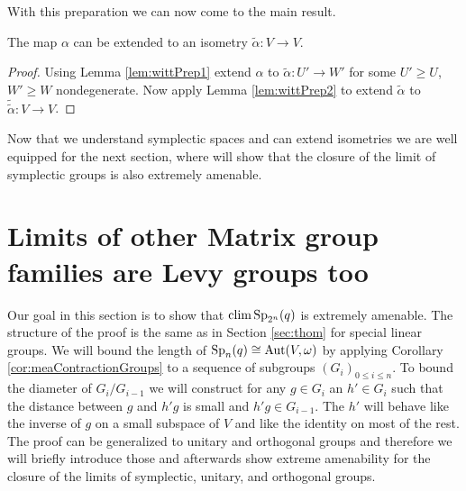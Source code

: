 With this preparation we can now come to the main result.
\begin{corollary}\label{lem:witt}
The map $\alpha$ can be extended to an isometry $\tilde{\alpha}\colon V\to V$.
\end{corollary}
\begin{proof}
Using Lemma \ref{lem:wittPrep1} extend $\alpha$ to $\tilde{\alpha}\colon U'\to W'$ for some $U'\geq U$, $W'\geq W$ nondegenerate. Now apply Lemma \ref{lem:wittPrep2} to extend $\tilde{\alpha}$ to $\tilde{\tilde{\alpha}}\colon V\to V$.
\end{proof}

Now that we understand symplectic spaces and can extend isometries we are well equipped for the next section, where will show that the closure of the limit of symplectic groups is also extremely amenable.


\section{Limits of other Matrix group families are Levy groups too}\label{sec:mySec}


Our goal in this section is to show that $\operatorname{clim} \operatorname{Sp}_{2^n}(q)$ is extremely amenable. The structure of the proof is the same as in Section \ref{sec:thom} for special linear groups. We will bound the length of $\operatorname{Sp}_n(q)\cong\operatorname{Aut}(V,\omega)$ by applying Corollary \ref{cor:meaContractionGroups} to a sequence of subgroups $(G_i)_{0\leq i\leq n}$. To bound the diameter of $G_i/G_{i-1}$ we will construct for any $g\in G_i$ an $h'\in G_i$ such that the distance between $g$ and $h'g$ is small and $h'g\in G_{i-1}$. The $h'$ will behave like the inverse of $g$ on a small subspace of $V$ and like the identity on most of the rest. The proof can be generalized to unitary and orthogonal groups and therefore we will briefly introduce those and afterwards show extreme amenability for the closure of the limits of symplectic, unitary, and orthogonal groups.

